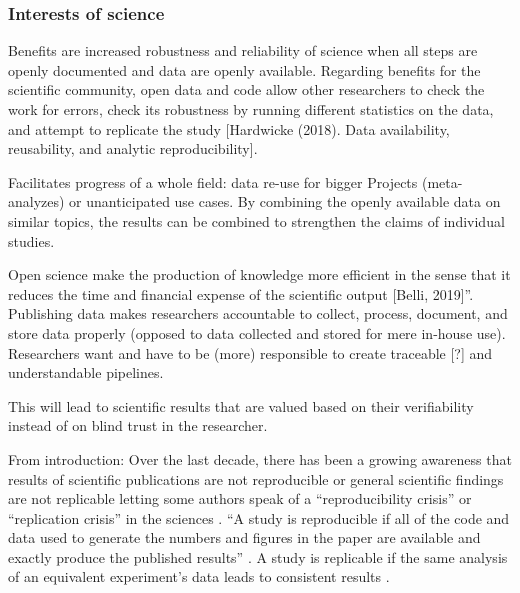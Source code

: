 \subsubsection{Interests of science}


%
Benefits are increased robustness and reliability of science when all steps are
openly documented and data are openly available.
%
Regarding benefits for the scientific community, open data and code allow other
researchers to check the work for errors, check its robustness by running
different statistics on the data, and attempt to replicate the study [Hardwicke
(2018). Data availability, reusability, and analytic reproducibility].

%
Facilitates progress of a whole field: data re-use for bigger Projects
(meta-analyzes) or unanticipated use cases.
%
By combining the openly available data on similar topics, the results can be
combined to strengthen the claims of individual studies.

%
Open science make the production of knowledge more efficient in the sense that
it reduces the time and financial expense of the scientific output [Belli,
2019]''.
%
Publishing data makes researchers accountable to collect, process, document, and
store data properly (opposed to data collected and stored for mere in-house
use).
%
Researchers want and have to be (more) responsible to create traceable [?] and
understandable pipelines.

%
This will lead to scientific results that are valued based on their
verifiability instead of on blind trust in the researcher.


From introduction:
Over the last decade, there has been a growing awareness that results of
scientific publications are not reproducible or general scientific findings are
not replicable letting some authors speak of a ``reproducibility crisis'' or
``replication crisis'' in the sciences \citep{baker2016reproducibility,
plesser2018reproducibility, stupple2019reproducibility, nosek2022replicability}.
``A study is reproducible if all of the code and data used to generate the
numbers and figures in the paper are available and exactly produce the published
results'' \citep{leek2017most}.
A study is replicable if the same analysis of an equivalent experiment's data
leads to consistent results \citep{dubois2016building, leek2017most}.


